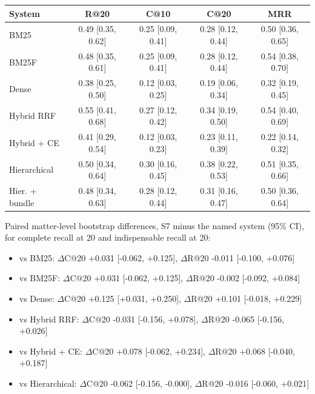 \small
\begin{tabular}{lcccc}
\toprule
System & R@20 & C@10 & C@20 & MRR \\
\midrule
BM25 & 0.49 [0.35, 0.62] & 0.25 [0.09, 0.41] & 0.28 [0.12, 0.44] & 0.50 [0.36, 0.65] \\
BM25F & 0.48 [0.35, 0.61] & 0.25 [0.09, 0.41] & 0.28 [0.12, 0.44] & 0.54 [0.38, 0.70] \\
Dense & 0.38 [0.25, 0.50] & 0.12 [0.03, 0.25] & 0.19 [0.06, 0.34] & 0.32 [0.19, 0.45] \\
Hybrid RRF & 0.55 [0.41, 0.68] & 0.27 [0.12, 0.42] & 0.34 [0.19, 0.50] & 0.54 [0.40, 0.69] \\
Hybrid + CE & 0.41 [0.29, 0.54] & 0.12 [0.03, 0.23] & 0.23 [0.11, 0.39] & 0.22 [0.14, 0.32] \\
Hierarchical & 0.50 [0.34, 0.64] & 0.30 [0.16, 0.45] & 0.38 [0.22, 0.53] & 0.51 [0.35, 0.66] \\
Hier. + bundle & 0.48 [0.34, 0.63] & 0.28 [0.12, 0.44] & 0.31 [0.16, 0.47] & 0.50 [0.36, 0.64] \\
\bottomrule
\end{tabular}

\medskip

Paired matter-level bootstrap differences, S7 minus the named system (95\% CI), for complete recall at 20 and indispensable recall at 20:
\begin{itemize}\setlength{\itemsep}{0pt}
\item vs BM25: $\Delta$C@20 +0.031 [-0.062, +0.125], $\Delta$R@20 -0.011 [-0.100, +0.076]
\item vs BM25F: $\Delta$C@20 +0.031 [-0.062, +0.125], $\Delta$R@20 -0.002 [-0.092, +0.084]
\item vs Dense: $\Delta$C@20 +0.125 [+0.031, +0.250], $\Delta$R@20 +0.101 [-0.018, +0.229]
\item vs Hybrid RRF: $\Delta$C@20 -0.031 [-0.156, +0.078], $\Delta$R@20 -0.065 [-0.156, +0.026]
\item vs Hybrid + CE: $\Delta$C@20 +0.078 [-0.062, +0.234], $\Delta$R@20 +0.068 [-0.040, +0.187]
\item vs Hierarchical: $\Delta$C@20 -0.062 [-0.156, -0.000], $\Delta$R@20 -0.016 [-0.060, +0.021]
\end{itemize}
